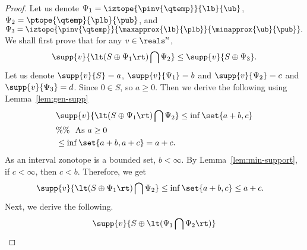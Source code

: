 \begin{proof}
Let us denote $\Psi_1=\iztope{\pinv{\qtemp}}{\lb}{\ub}$,
$\Psi_2=\ptope{\qtemp}{\plb}{\pub}$, and 
$\Psi_3=\iztope{\pinv{\qtemp}}{\maxapprox{\lb}{\plb}}{\minapprox{\ub}{\pub}}.$
We shall first prove that for any $v\in\reals^n$,
%
\begin{equation}
\supp{v}{\lt(S\oplus\Psi_1\rt)\bigcap\Psi_2}\leq
\supp{v}{S\oplus\Psi_3}.
\end{equation}
%
Let us denote $\supp{v}{S}=a$, $\supp{v}{\Psi_1}=b$ and
$\supp{v}{\Psi_2}=c$ and $\supp{v}{\Psi_3}=d$.  Since $0\in S$, so
$a\geq 0$.  Then we derive the following using
Lemma~\ref{lem:gen-supp}
%
\begin{align*}
& \supp{v}{\lt(S\oplus \Psi_1\rt)\bigcap\Psi_2}\leq \inf\set{a+b,c}\\
  & \%\%~~\text{As}~a\geq 0\\
& \leq\inf\set{a+b,a+c}=a+c.
\end{align*}
%
As an interval zonotope is a bounded set, $b<\infty$.  By
Lemma~\ref{lem:min-support}, if $c<\infty$, then $c<b$.  Therefore, we
get
%
\begin{align*}
& \supp{v}{\lt(S\oplus \Psi_1\rt)\bigcap\Psi_2}\leq
  \inf\set{a+b,c}\leq a+c.
\end{align*}
%
Next, we derive the following.
%
\begin{align*}
\supp{v}{S\oplus\lt(\Psi_1\bigcap\Psi_2\rt)}
\end{align*}
%
\end{proof}
%
